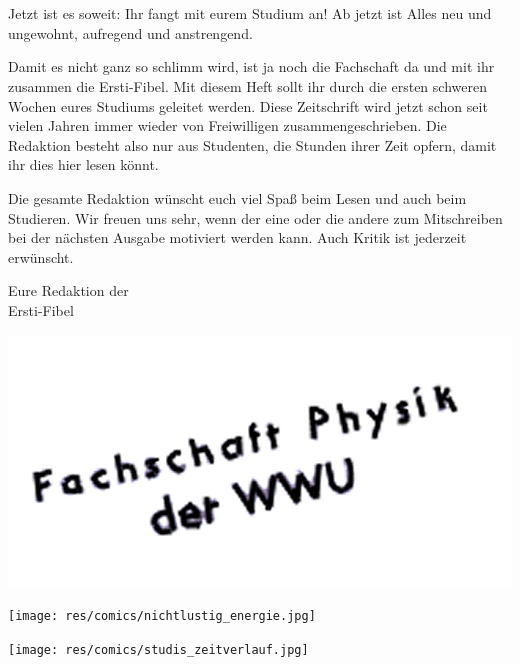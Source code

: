 
\section*{\Huge{}}
\begin{multicols*}{2}
Jetzt ist es soweit: Ihr fangt mit eurem Studium an! Ab jetzt ist Alles neu und ungewohnt, aufregend und anstrengend.

Damit es nicht ganz so schlimm wird, ist ja noch die Fachschaft da und mit ihr zusammen die Ersti-Fibel. Mit diesem Heft sollt ihr durch die ersten schweren Wochen eures Studiums geleitet werden. Diese Zeitschrift wird jetzt schon seit vielen Jahren immer wieder von Freiwilligen zusammengeschrieben. Die Redaktion besteht also nur aus Studenten, die Stunden ihrer Zeit opfern, damit ihr dies hier lesen könnt.

Die gesamte Redaktion wünscht euch viel Spaß beim Lesen und auch beim Studieren. Wir freuen uns sehr, wenn der eine oder die andere zum Mitschreiben bei der nächsten Ausgabe motiviert werden kann. Auch Kritik ist jederzeit erwünscht.

Eure Redaktion der\\
Ersti-Fibel

\vspace{-0.75cm}
\hspace{2cm}
\includegraphics{res/fsphys_stempel.png}

\vspace{1.8cm}
\texttt{[image: res/comics/nichtlustig\_energie.jpg]}
\vspace{\fill}

\columnbreak

\texttt{[image: res/comics/studis\_zeitverlauf.jpg]}

\vspace{-0.5cm}

\end{multicols*}
